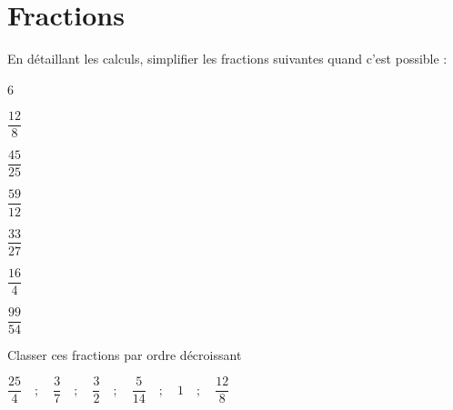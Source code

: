\section{Fractions}

\begin{questions}
	\question En détaillant les calculs, simplifier les fractions suivantes quand c'est possible :
	
	
	\begin{itemize}
	\end{itemize}

	\question Classer ces fractions par ordre décroissant
	
	\begin{center}
		$\dfrac{25}{4} \quad  ; \quad \dfrac{3}{7} \quad ; \quad \dfrac{3}{2} \quad ; \quad \dfrac{5}{14} \quad ; \quad 1 \quad ; \quad \dfrac{12}{8} $
	\end{center}
	
\end{questions}
